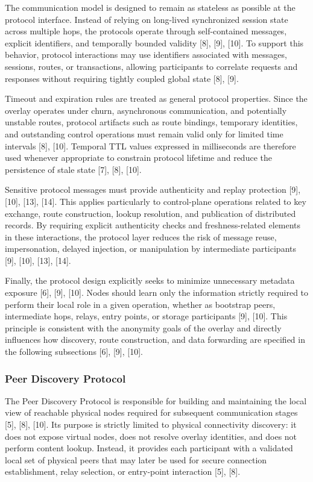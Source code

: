 \documentclass[12pt,a4paper]{article}
\begin{document}
The communication model is designed to remain as stateless as possible at the protocol interface. Instead of relying on long-lived synchronized session state across multiple hops, the protocols operate through self-contained messages, explicit identifiers, and temporally bounded validity [8], [9], [10]. To support this behavior, protocol interactions may use identifiers associated with messages, sessions, routes, or transactions, allowing participants to correlate requests and responses without requiring tightly coupled global state [8], [9].

Timeout and expiration rules are treated as general protocol properties. Since the overlay operates under churn, asynchronous communication, and potentially unstable routes, protocol artifacts such as route bindings, temporary identities, and outstanding control operations must remain valid only for limited time intervals [8], [10]. Temporal TTL values expressed in milliseconds are therefore used whenever appropriate to constrain protocol lifetime and reduce the persistence of stale state [7], [8], [10].

Sensitive protocol messages must provide authenticity and replay protection [9], [10], [13], [14]. This applies particularly to control-plane operations related to key exchange, route construction, lookup resolution, and publication of distributed records. By requiring explicit authenticity checks and freshness-related elements in these interactions, the protocol layer reduces the risk of message reuse, impersonation, delayed injection, or manipulation by intermediate participants [9], [10], [13], [14].

Finally, the protocol design explicitly seeks to minimize unnecessary metadata exposure [6], [9], [10]. Nodes should learn only the information strictly required to perform their local role in a given operation, whether as bootstrap peers, intermediate hops, relays, entry points, or storage participants [9], [10]. This principle is consistent with the anonymity goals of the overlay and directly influences how discovery, route construction, and data forwarding are specified in the following subsections [6], [9], [10].

\subsubsection{Peer Discovery Protocol}

The Peer Discovery Protocol is responsible for building and maintaining the local view of reachable physical nodes required for subsequent communication stages [5], [8], [10]. Its purpose is strictly limited to physical connectivity discovery: it does not expose virtual nodes, does not resolve overlay identities, and does not perform content lookup. Instead, it provides each participant with a validated local set of physical peers that may later be used for secure connection establishment, relay selection, or entry-point interaction [5], [8].
\end{document}
